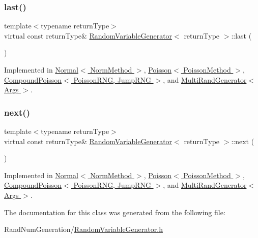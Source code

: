 \subsubsection{\texorpdfstring{last()}{last()}}
{\footnotesize\ttfamily template$<$typename return\+Type$>$ \\
virtual const return\+Type\& \hyperlink{class_random_variable_generator}{Random\+Variable\+Generator}$<$ return\+Type $>$\+::last (\begin{DoxyParamCaption}{ }\end{DoxyParamCaption})\hspace{0.3cm}{\ttfamily [pure virtual]}}



Implemented in \hyperlink{class_normal_a3f10787d08cb2479764d7e0da8256aa7}{Normal$<$ Norm\+Method $>$}, \hyperlink{class_poisson_a85d653cd5405fed6aadc761cb15668e6}{Poisson$<$ Poisson\+Method $>$}, \hyperlink{class_compound_poisson_a1a3bdf34c71996f6e549ffe3c7bcbbea}{Compound\+Poisson$<$ Poisson\+R\+N\+G, Jump\+R\+N\+G $>$}, and \hyperlink{class_multi_rand_generator_abb83dee0545ca24fab2999144de6f0e3}{Multi\+Rand\+Generator$<$ Args $>$}.

\hypertarget{class_random_variable_generator_a5178e1f85eff432dffd6320767136836}{}\label{class_random_variable_generator_a5178e1f85eff432dffd6320767136836} 
\subsubsection{\texorpdfstring{next()}{next()}}
{\footnotesize\ttfamily template$<$typename return\+Type$>$ \\
virtual const return\+Type\& \hyperlink{class_random_variable_generator}{Random\+Variable\+Generator}$<$ return\+Type $>$\+::next (\begin{DoxyParamCaption}{ }\end{DoxyParamCaption})\hspace{0.3cm}{\ttfamily [pure virtual]}}



Implemented in \hyperlink{class_normal_a2cd9c31195181491a4bf0d3856746437}{Normal$<$ Norm\+Method $>$}, \hyperlink{class_poisson_ac5b7abe30dce61dd6a587e565d69802e}{Poisson$<$ Poisson\+Method $>$}, \hyperlink{class_compound_poisson_a4e16aa85ae83e5c3529b282811bbc689}{Compound\+Poisson$<$ Poisson\+R\+N\+G, Jump\+R\+N\+G $>$}, and \hyperlink{class_multi_rand_generator_a39838e440c70bb6de68052a2ea25e258}{Multi\+Rand\+Generator$<$ Args $>$}.



The documentation for this class was generated from the following file\+:\begin{DoxyCompactItemize}
\item 
Rand\+Num\+Generation/\hyperlink{_random_variable_generator_8h}{Random\+Variable\+Generator.\+h}\end{DoxyCompactItemize}
